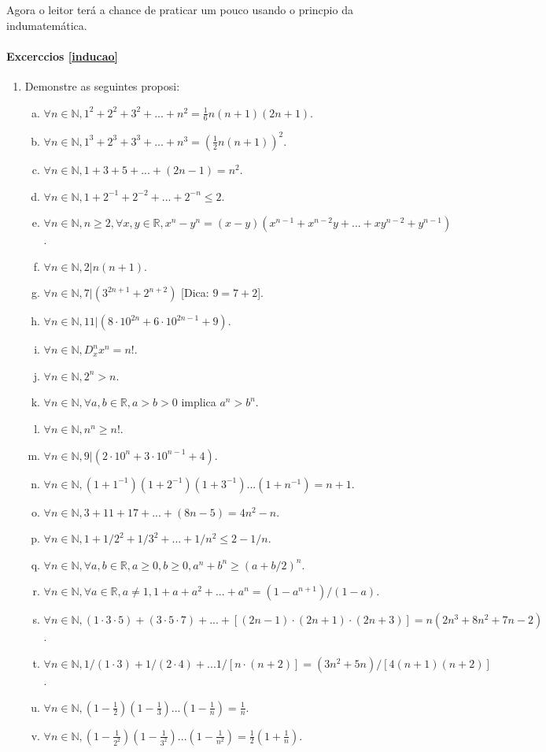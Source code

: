 Agora o leitor ter\'a a chance de praticar um pouco usando o princ\ih pio da indu\cao matem\'atica.

\paragraph{Excerc\ih cios \ref{inducao}}

\begin{enumerate}[{\bf 1.}]
\item\label{inducaoexce1} Demonstre as seguintes proposi\cois:
\begin{enumerate}[a)]
\item\label{inducaoexce1a} $\forall n\in\mathbb{N}, 1^2+2^2+3^2+...+n^2=\frac{1}{6}n(n+1)(2n+1)$.
\item\label{inducaoexce1b} $\forall n\in\mathbb{N}, 1^3+2^3+3^3+...+n^3=(\frac{1}{2}n(n+1))^2$.
\item $\forall n\in\mathbb{N}, 1+3+5+...+(2n-1)=n^2$.
\item $\forall n\in\mathbb{N}, 1+2^{-1}+2^{-2}+...+2^{-n}\leq 2$.
\item $\forall n\in\mathbb{N}, n\geq 2, \forall x,y\in\mathbb{R}, x^n-y^n=(x-y)(x^{n-1}+x^{n-2}y+...+xy^{n-2}+y^{n-1})$.
\item $\forall n\in\mathbb{N}, 2|n(n+1)$.
\item $\forall n\in\mathbb{N}, 7|(3^{2n+1}+2^{n+2})$ [Dica: $9=7+2$].
\item $\forall n\in\mathbb{N}, 11|(8\cdot 10^{2n}+6\cdot 10^{2n-1}+9)$.
\item $\forall n\in\mathbb{N}, D^n_x x^n=n!$.
\item $\forall n\in\mathbb{N}, 2^n>n$.
\item $\forall n\in\mathbb{N}, \forall a,b\in\mathbb{R}, a>b>0$ implica $a^n>b^n$.
\item $\forall n\in\mathbb{N}, n^n\geq n!$.
\item $\forall n\in\mathbb{N}, 9|(2\cdot 10^n+3\cdot 10^{n-1}+4)$.
\item $\forall n\in\mathbb{N}, (1+1^{-1})(1+2^{-1})(1+3^{-1})...(1+n^{-1})=n+1$.
\item $\forall n\in\mathbb{N}, 3+11+17+...+(8n-5)=4n^2-n$.
\item $\forall n\in\mathbb{N}, 1+1/2^2+1/3^2+...+1/n^2\leq 2-1/n$.
\item $\forall n\in\mathbb{N}, \forall a,b\in\mathbb{R}, a\geq 0, b\geq 0, a^n+b^n\geq(a+b/2)^n$.
\item $\forall n\in\mathbb{N}, \forall a\in\mathbb{R}, a\neq 1, 1+a+a^2+...+a^n=(1-a^{n+1})/(1-a)$.
\item $\forall n\in\mathbb{N}, (1\cdot 3\cdot 5)+(3\cdot 5\cdot 7)+...+[(2n-1)\cdot (2n+1)\cdot (2n+3)]=n(2n^3+8n^2+7n-2)$.
\item $\forall n\in\mathbb{N}, 1/(1\cdot 3)+1/(2\cdot 4)+...1/[n\cdot(n+2)]=(3n^2+5n)/[4(n+1)(n+2)]$.
\item $\forall n\in\mathbb{N}, (1-\frac{1}{2})(1-\frac{1}{3})...(1-\frac{1}{n})=\frac{1}{n}$.
\item $\forall n\in\mathbb{N}, (1-\frac{1}{2^2})(1-\frac{1}{3^2})...(1-\frac{1}{n^2})=\frac{1}{2}(1+\frac{1}{n})$.
\end{enumerate}


\end{enumerate}
